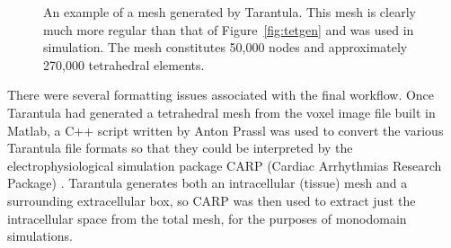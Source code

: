   \begin{figure}[htbp]
    \centering
    \caption{An example of a mesh generated by Tarantula. This mesh is clearly much more regular than that of Figure~\ref{fig:tetgen} and was used in simulation. The mesh constitutes 50,000 nodes and approximately 270,000 tetrahedral elements.}
    \label{fig:tarantula}
  \end{figure}
  
  There were several formatting issues associated with the final workflow. Once Tarantula had generated a tetrahedral mesh from the voxel image file built in Matlab, a C++ script written by Anton Prassl was used to convert the various Tarantula file formats so that they could be interpreted by the electrophysiological simulation package CARP (Cardiac Arrhythmias Research Package) \cite{Vigmond2003}. Tarantula generates both an intracellular (tissue) mesh and a surrounding extracellular box, so CARP was then used to extract just the intracellular space from the total mesh, for the purposes of monodomain simulations.
  
